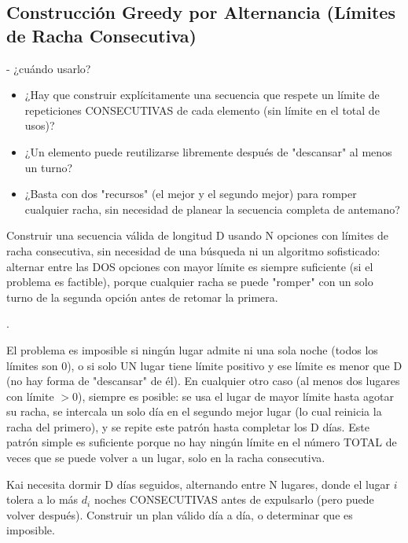 \subsection{Construcción Greedy por Alternancia (Límites de Racha Consecutiva)}

 - ¿cuándo usarlo?

\begin{itemize}
\item ¿Hay que construir explícitamente una secuencia que respete un límite de repeticiones CONSECUTIVAS de cada elemento (sin límite en el total de usos)?
\item ¿Un elemento puede reutilizarse libremente después de "descansar" al menos un turno?
\item ¿Basta con dos "recursos" (el mejor y el segundo mejor) para romper cualquier racha, sin necesidad de planear la secuencia completa de antemano?
\end{itemize}

 Construir una secuencia válida de longitud D usando N opciones con límites de racha consecutiva, sin necesidad de una búsqueda ni un algoritmo sofisticado: alternar entre las DOS opciones con mayor límite es siempre suficiente (si el problema es factible), porque cualquier racha se puede "romper" con un solo turno de la segunda opción antes de retomar la primera.

 .

 El problema es imposible si ningún lugar admite ni una sola noche (todos los límites son 0), o si solo UN lugar tiene límite positivo y ese límite es menor que D (no hay forma de "descansar" de él). En cualquier otro caso (al menos dos lugares con límite $>0$), siempre es posible: se usa el lugar de mayor límite hasta agotar su racha, se intercala un solo día en el segundo mejor lugar (lo cual reinicia la racha del primero), y se repite este patrón hasta completar los D días. Este patrón simple es suficiente porque no hay ningún límite en el número TOTAL de veces que se puede volver a un lugar, solo en la racha consecutiva.


Kai necesita dormir D días seguidos, alternando entre N lugares, donde el lugar $i$ tolera a lo más $d_i$ noches CONSECUTIVAS antes de expulsarlo (pero puede volver después). Construir un plan válido día a día, o determinar que es imposible.

